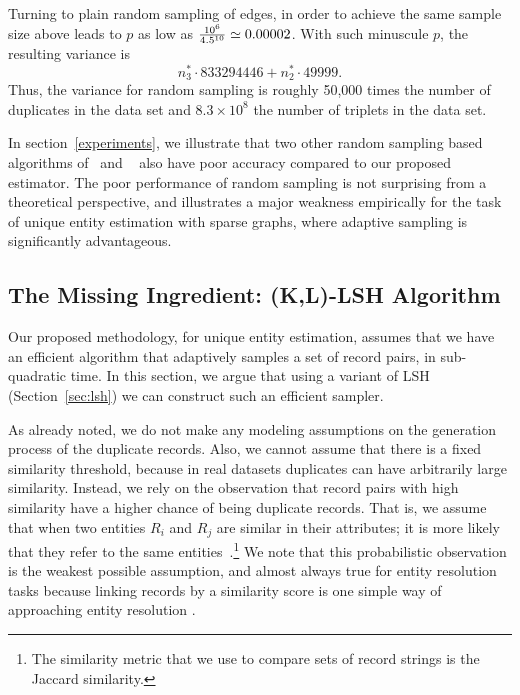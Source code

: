 \documentclass[aoas]{imsart}
\begin{document}
Turning to plain random sampling of edges, in order to achieve the same sample size above leads to $p$ as low as $\frac{10^6}{4.5 \time 10^{10}} \simeq 0.00002$. With such minuscule $p$, the resulting variance is $$n_3^* \cdot 833294446 + n_2^*\cdot 49999.$$ Thus, the variance for random sampling is roughly 50,000 times the number of duplicates in the data set and $8.3 \times 10^8$ the number of triplets in the data set.

In section~\ref{experiments}, we illustrate that two other random sampling based algorithms of~\cite{chazelle2005approximating} and ~\cite{1978paper} also have poor accuracy compared to our proposed estimator. The poor performance of random sampling is not surprising from a theoretical perspective, and illustrates a major weakness empirically for the task of unique entity estimation with sparse graphs, where adaptive sampling is significantly advantageous.

\subsection{The Missing Ingredient: (K,L)-LSH Algorithm}
\label{sec:missingVariant}
Our proposed methodology, for unique entity estimation, assumes that we have an efficient algorithm that adaptively samples a set of record pairs, in sub-quadratic time. In this section, we argue that using a variant of LSH (Section~\ref{sec:lsh}) we can construct such an efficient sampler.

As already noted, we do not make any modeling assumptions on the generation process of the duplicate records. Also, we cannot assume that there is a fixed similarity threshold, because in real datasets duplicates can have arbitrarily large similarity. Instead, we rely on the observation that record pairs with high similarity have a higher chance of being duplicate records.  That is, we assume that when two  entities $R_i$ and $R_j$ are similar in their attributes; it is more likely that they refer to the same entities~\citep{christen_2012}.\footnote{The similarity metric that we use to compare sets of record strings is the Jaccard similarity.} We note that this probabilistic observation is the weakest possible assumption, and almost always true for entity resolution tasks because linking records by a similarity score is one simple way of approaching entity resolution \citep{christen_2012, winkler_2006, fellegi_1969}.
\end{document}
